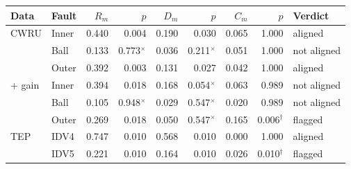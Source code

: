 \begin{tabular}{@{}llrrrrrrl@{}}
\toprule
Data & Fault & $R_m$ & $p$ & $D_m$ & $p$ & $C_m$ & $p$ & Verdict \\
\midrule
CWRU & Inner & 0.440 & 0.004 & 0.190 & 0.030 & 0.065 & 1.000 & aligned \\
 & Ball & 0.133 & 0.773$^{\times}$ & 0.036 & 0.211$^{\times}$ & 0.051 & 1.000 & not aligned \\
 & Outer & 0.392 & 0.003 & 0.131 & 0.027 & 0.042 & 1.000 & aligned \\
\addlinespace
+ gain & Inner & 0.394 & 0.018 & 0.168 & 0.054$^{\times}$ & 0.063 & 0.989 & not aligned \\
 & Ball & 0.105 & 0.948$^{\times}$ & 0.029 & 0.547$^{\times}$ & 0.020 & 0.989 & not aligned \\
 & Outer & 0.269 & 0.018 & 0.050 & 0.547$^{\times}$ & 0.165 & 0.006$^{\dagger}$ & flagged \\
\addlinespace
TEP & IDV4 & 0.747 & 0.010 & 0.568 & 0.010 & 0.000 & 1.000 & aligned \\
 & IDV5 & 0.221 & 0.010 & 0.164 & 0.010 & 0.026 & 0.010$^{\dagger}$ & flagged \\
\bottomrule
\end{tabular}
